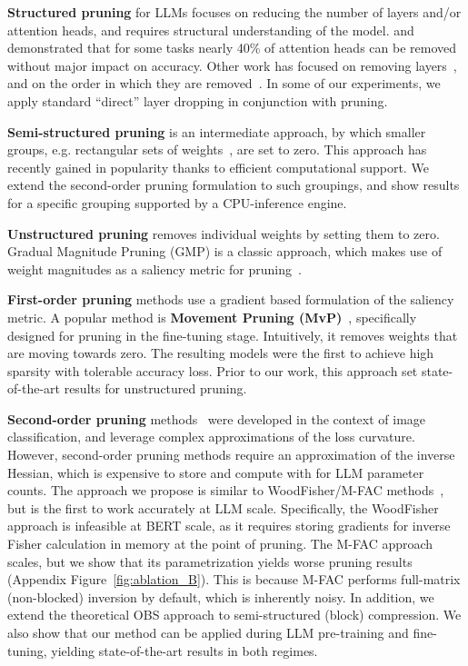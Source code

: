 \documentclass[11pt]{article}
\begin{document}
\noindent\textbf{Structured pruning} for LLMs focuses on reducing the number of layers and/or attention heads, and requires structural understanding of the model. 
\citet{Michel2019AreSH} and \citet{Voita2019AnalyzingMS} demonstrated that for some tasks nearly 40\% of attention heads can be removed without major impact on accuracy. 
Other work has focused on removing layers~\cite{Sridhar2020UndividedAA}, and on the order in which they are removed~\cite{DBLP:journals/corr/abs-2004-03844}. In some of our experiments, we apply standard ``direct'' layer dropping in conjunction with pruning.

\noindent\textbf{Semi-structured pruning} is an intermediate approach, by which smaller groups, e.g. rectangular sets of weights~\cite{lagunas21block}, are set to zero. This approach has recently gained in popularity thanks to efficient computational support. We extend the second-order pruning formulation to such groupings, and show results for a specific grouping supported by a CPU-inference engine.

\noindent\textbf{Unstructured pruning} removes individual weights by setting them to zero.
Gradual Magnitude Pruning (GMP) is a classic approach, which makes use of weight magnitudes as a saliency metric for pruning~\cite{Han2015ADN, Gale2019TheSO}.

\noindent\textbf{First-order pruning} methods use a gradient based formulation of the saliency metric. A popular method is \textbf{Movement Pruning (MvP)}~\cite{Sanh2020MovementPA}, specifically designed for pruning in the fine-tuning stage. Intuitively, it removes weights that are moving towards zero. The resulting models were the first to achieve high sparsity with tolerable accuracy loss. Prior to our work, this approach set state-of-the-art results for unstructured pruning.

\noindent\textbf{Second-order pruning} methods~\cite{LeCun1989OptimalBD, hassibi1993second, Singh2020WoodFisherES, Frantar2021EfficientMA} were developed in the context of image classification, and leverage complex approximations of the loss curvature. 
However, second-order pruning methods require an approximation of the inverse Hessian, which is expensive to store and compute with for LLM parameter counts. The approach we propose is similar to  WoodFisher/M-FAC methods~\cite{Singh2020WoodFisherES, Frantar2021EfficientMA}, but is the first to work accurately at LLM scale. Specifically, the WoodFisher approach is infeasible at BERT scale, as it requires storing gradients for inverse Fisher calculation in memory at the point of pruning. 
The M-FAC approach scales, but we show that its parametrization yields worse pruning results (Appendix Figure~\ref{fig:ablation_B}). 
This is because M-FAC performs full-matrix (non-blocked) inversion by default, which is inherently noisy. 
In addition, we extend the theoretical OBS approach to semi-structured (block) compression. We also show that our method can be applied during LLM pre-training and fine-tuning, yielding state-of-the-art results in both regimes.
\end{document}
